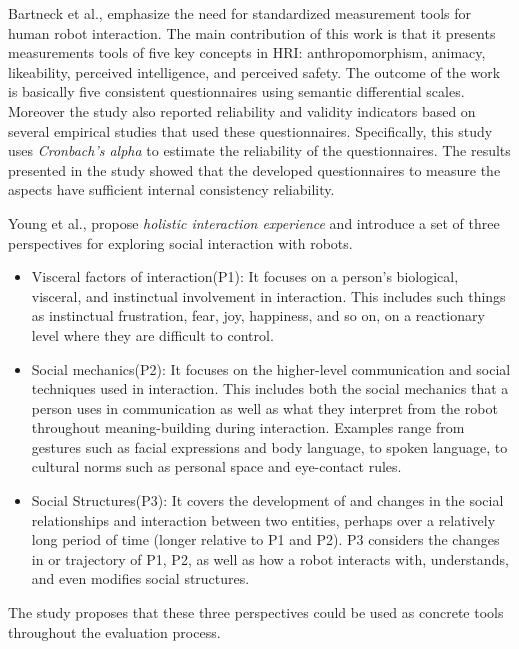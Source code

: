 {\begin{table}[H]
\begin{tabularx}{400pt}{c*3{X}}
  										\bottomrule
\end{tabularx}
\end{table}

	Bartneck et al.,\cite{Bartneck2009} emphasize the need for standardized measurement tools for human robot interaction. The main contribution of this work is that it presents measurements tools of five key concepts in HRI: anthropomorphism, animacy, likeability, perceived intelligence, and perceived safety. The outcome of the work is basically five consistent questionnaires using semantic differential scales. Moreover the study also reported reliability and validity indicators based on several empirical studies that used these questionnaires. Specifically, this study uses \emph{Cronbach's alpha} to estimate the reliability of the questionnaires. The results presented in the study showed that the developed questionnaires to measure the aspects have sufficient internal consistency reliability. 
	
	Young et al.,\cite{Young2011} propose \emph{holistic interaction experience} and introduce a set of three perspectives for exploring social interaction with robots.
\begin{itemize}
\item Visceral factors of interaction(P1): It focuses on a person’s biological, visceral, and instinctual involvement in interaction. This includes such things as instinctual frustration, fear, joy, happiness, and so on, on a reactionary level where they are difficult to control.
\item Social mechanics(P2): It focuses on the higher-level communication and social techniques used in interaction. This includes both the social mechanics that a person uses in communication as well as what they interpret from the robot throughout meaning-building during interaction. Examples range from gestures such as facial expressions and body language, to spoken language, to cultural norms such as personal space and eye-contact rules.
\item Social Structures(P3): It covers the development of and changes in the social relationships and interaction between two entities, perhaps over a relatively long period of time (longer relative to P1 and P2). P3 considers the changes in or trajectory of P1, P2, as well as how a robot interacts with, understands, and even modifies social structures.
\end{itemize}
The study proposes that these three perspectives could be used as concrete tools throughout the evaluation process. 

}
